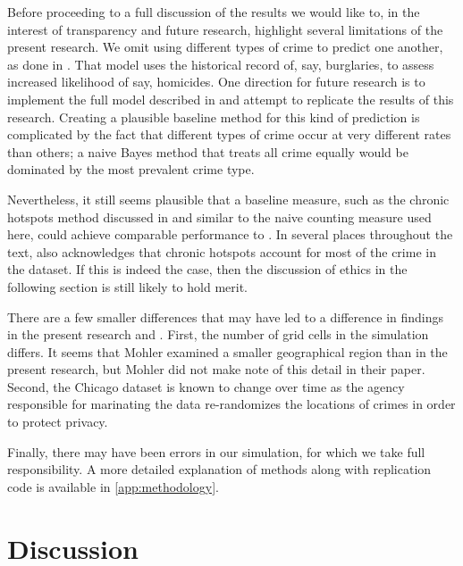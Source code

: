Before proceeding to a full discussion of the results we would like to, in the interest of transparency and future research, highlight several limitations of the present research. We omit using different types of crime to predict one another, as done in \citet{mohler_marked_2014}. That model uses the historical record of, say, burglaries, to assess increased likelihood of say, homicides. One direction for future research is to implement the full model described in \citet{mohler_marked_2014} and attempt to replicate the results of this research. Creating a plausible baseline method for this kind of prediction is complicated by the fact that different types of crime occur at very different rates than others; a naive Bayes method that treats all crime equally would be dominated by the most prevalent crime type.

Nevertheless, it still seems plausible that a baseline measure, such as the chronic hotspots method discussed in \citet{mohler_marked_2014} and similar to the naive counting measure used here, could achieve comparable performance to \pp. In several places throughout the text, \citet{mohler_marked_2014} also acknowledges that chronic hotspots account for most of the crime in the dataset. If this is indeed the case, then the discussion of ethics in the following section is still likely to hold merit. 


There are a few smaller differences that may have led to a difference in findings in the present research and \citet{mohler_marked_2014}. First, the number of grid cells in the simulation differs. It seems that Mohler examined a smaller geographical region than in the present research, but Mohler did not make note of this detail in their paper. Second, the Chicago dataset is known to change over time as the agency responsible for marinating the data re-randomizes the locations of crimes in order to protect privacy.

Finally, there may have been errors in our simulation, for which we take full responsibility. A more detailed explanation of methods along with replication code is available in \autoref{app:methodology}.

\section{Discussion} \label{sec:discussion}

